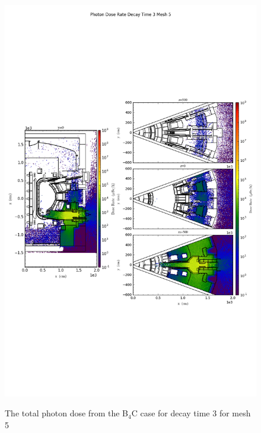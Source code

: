 \begin{figure}[ht!]
\centering
\includegraphics[trim={0cm 9cm 0cm 10cm},clip,scale=0.75]{../plots/final_model_nob4c/Photon_Dose_Rate_Decay_Time_3_Mesh_5.png}
\label{fig:photons_dc3_no4bc_m5_flux}
\caption{The total photon dose from the B$_4$C case for decay time 3 for mesh 5}
\end{figure}
